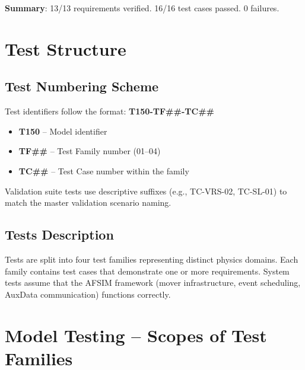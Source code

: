 \unclass \textbf{Summary}: 13/13 requirements verified. 16/16 test cases passed. 0 failures.

\pagebreak


\section{\unclass Test Structure}\label{sec:TestStructure}

\subsection{\unclass Test Numbering Scheme}\label{sec:TestNumberingScheme}

\unclass Test identifiers follow the format: \textbf{T150-TF\#\#-TC\#\#}

\begin{itemize}
	\item \unclass \textbf{T150} -- Model identifier
	\item \unclass \textbf{TF\#\#} -- Test Family number (01--04)
	\item \unclass \textbf{TC\#\#} -- Test Case number within the family
\end{itemize}

\unclass Validation suite tests use descriptive suffixes (e.g., TC-VRS-02, TC-SL-01) to match the master validation scenario naming.

\subsection{\unclass Tests Description}\label{sec:TestsDescription}

\unclass Tests are split into four test families representing distinct physics domains. Each family contains test cases that demonstrate one or more requirements. System tests assume that the AFSIM framework (mover infrastructure, event scheduling, AuxData communication) functions correctly.

\pagebreak


\section{\unclass Model Testing -- Scopes of Test Families}\label{sec:TestFamilyScopes}

